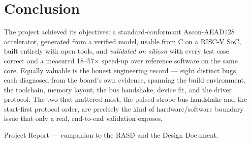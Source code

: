 \documentclass[11pt,a4paper]{article}
\begin{document}
\section{Conclusion}
The project achieved its objectives: a standard-conformant Ascon-AEAD128
accelerator, generated from a verified model, usable from C on a RISC-V SoC, built
entirely with open tools, and \emph{validated on silicon} with every test case
correct and a measured 18--57$\times$ speed-up over reference software on the same
core. Equally valuable is the honest engineering record --- eight distinct bugs,
each diagnosed from the board's own evidence, spanning the build environment, the
toolchain, memory layout, the bus handshake, device fit, and the driver protocol.
The two that mattered most, the pulsed-strobe bus handshake and the start-first
protocol order, are precisely the kind of hardware/software boundary issue that
only a real, end-to-end validation exposes.

\vfill
\begin{center}\small\color{gray}
Project Report --- companion to the RASD and the Design Document.
\end{center}
\end{document}
